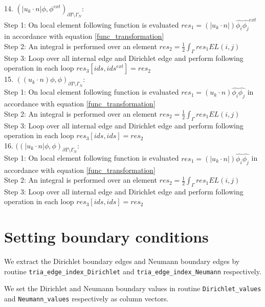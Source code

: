 \documentclass[a4paper]{book}
\begin{document}
14. $(|u_k \cdot n| \phi,\phi^{ext})_{\partial T \setminus \Gamma_N}$:\\
Step 1: On local element following function is evaluated $res_1 = (|u_k \cdot n|) \hat{\phi_i} \hat{\phi_j}^{ext} $ in accordance with equation \ref{func_transformation}\\
Step 2: An integral is performed over an element $res_2 = \frac{1}{2} \int_{\Gamma} res_1 EL(i,j) $\\
Step 3: Loop over all internal edge and Dirichlet edge and perform following operation in each loop $res_3[ids,ids^{ext}] = res_2$\\

15. $((u_k \cdot n)\phi,\phi)_{\partial T \setminus \Gamma_N}$:\\
Step 1: On local element following function is evaluated $res_1 = (u_k \cdot n) \hat{\phi_i} \hat{\phi_j} $ in accordance with equation \ref{func_transformation}\\
Step 2: An integral is performed over an element $res_2 = \frac{1}{2} \int_{\Gamma} res_1 EL(i,j) $\\
Step 3: Loop over all internal edge and Dirichlet edge and perform following operation in each loop $res_3[ids,ids] = res_2$\\

16. $((|u_k \cdot n| \phi,\phi)_{\partial T \setminus \Gamma_N}$:\\
Step 1: On local element following function is evaluated $res_1 = (|u_k \cdot n|) \hat{\phi_i} \hat{\phi_j} $ in accordance with equation \ref{func_transformation}\\
Step 2: An integral is performed over an element $res_2 = \frac{1}{2} \int_{\Gamma} res_1 EL(i,j) $\\
Step 3: Loop over all internal edge and Dirichlet edge and perform following operation in each loop $res_3[ids,ids] = res_2$\\

\section{Setting boundary conditions}

We extract the Dirichlet boundary edges and Neumann boundary edges by routine \verb|tria_edge_index_Dirichlet| and \verb|tria_edge_index_Neumann| respectively.

We set the Dirichlet and Neumann boundary values in routine \verb|Dirichlet_values| and \verb|Neumann_values| respectively as column vectors. 
\end{document}
